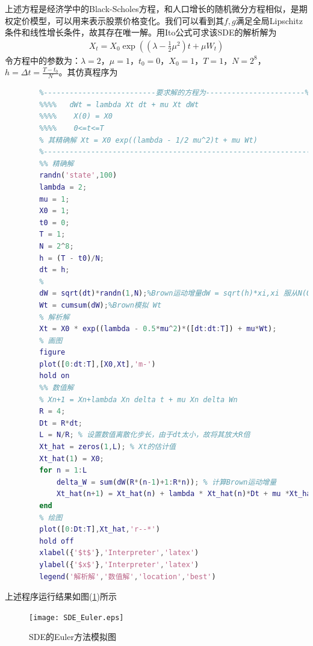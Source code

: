         上述方程是经济学中的Black-Scholes方程，和人口增长的随机微分方程相似，是期权定价模型，可以用来表示股票价格变化。我们可以看到其$f,g$满足全局Lipschitz条件和线性增长条件，故其存在唯一解。用Ito公式可求该SDE的解析解为
        \begin{align*}
            X_t = X_0\exp\left( \left( \lambda -\frac 12 \mu^2\right)t + \mu W_t \right)
        \end{align*}
        令方程中的参数为：$\lambda = 2$，$\mu = 1$，$t_0 = 0$，$X_0 = 1$，$T = 1$，$N = 2^8$，$h = \Delta t = \frac{T - t_0}{N}$。其仿真程序为
        \begin{lstlisting}[language= Matlab]
        %% 此程序用于SDE章节Euler数值方法的展示
        %--------------------------要求解的方程为-----------------------%
        %%%%   dWt = lambda Xt dt + mu Xt dWt
        %%%%    X(0) = X0
        %%%%    0<=t<=T
        % 其精确解 Xt = X0 exp((lambda - 1/2 mu^2)t + mu Wt)
        %---------------------------------------------------------------%
        %% 精确解
        randn('state',100)
        lambda = 2;
        mu = 1;
        X0 = 1;
        t0 = 0;
        T = 1;
        N = 2^8;
        h = (T - t0)/N;
        dt = h;
        %
        dW = sqrt(dt)*randn(1,N);%Brown运动增量dW = sqrt(h)*xi,xi 服从N(0,1)
        Wt = cumsum(dW);%Brown模拟 Wt
        % 解析解
        Xt = X0 * exp((lambda - 0.5*mu^2)*([dt:dt:T]) + mu*Wt);
        % 画图
        figure
        plot([0:dt:T],[X0,Xt],'m-')
        hold on
        %% 数值解
        % Xn+1 = Xn+lambda Xn delta t + mu Xn delta Wn
        R = 4;
        Dt = R*dt;
        L = N/R; % 设置数值离散化步长，由于dt太小，故将其放大R倍
        Xt_hat = zeros(1,L); % Xt的估计值
        Xt_hat(1) = X0;
        for n = 1:L
            delta_W = sum(dW(R*(n-1)+1:R*n)); % 计算Brown运动增量
            Xt_hat(n+1) = Xt_hat(n) + lambda * Xt_hat(n)*Dt + mu *Xt_hat(n)*delta_W;
        end
        % 绘图
        plot([0:Dt:T],Xt_hat,'r--*')
        hold off
        xlabel({'$t$'},'Interpreter','latex')
        ylabel({'$x$'},'Interpreter','latex')
        legend('解析解','数值解','location','best')
        \end{lstlisting}
        \par
        上述程序运行结果如图(\ref{fig:SDE的Euler方法模拟图})所示
        \begin{figure}[H]
            \centering
            \texttt{[image: SDE\_Euler.eps]}
            \caption{SDE的Euler方法模拟图}
            \label{fig:SDE的Euler方法模拟图}
        \end{figure}
